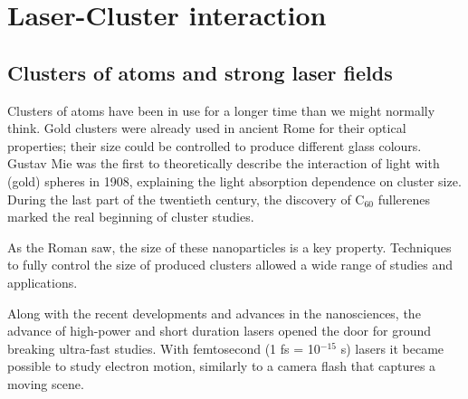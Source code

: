 
\section{Laser-Cluster interaction}

\subsection{Clusters of atoms and strong laser fields}

Clusters of atoms have been in use for a longer time than we might normally
think. Gold clusters were already used in ancient Rome for their optical
properties; their size could be controlled to produce different glass colours.
Gustav Mie was the first to theoretically describe the interaction of light
with (gold) spheres in 1908, explaining the light absorption dependence
on cluster size. During the last part of the twentieth century, the discovery of
C$_{60}$ fullerenes marked the real beginning of cluster studies.

As the Roman saw, the size of these nanoparticles is a key property. Techniques to fully
control the size of produced clusters allowed a wide range of studies and
applications.



Along with the recent developments and advances in the nanosciences,
the advance of high-power and short duration lasers opened the
door for ground breaking ultra-fast studies. With femtosecond
(1 fs = 10$^{-15}$ s) lasers it became possible to study electron motion,
similarly to a camera flash that captures a moving scene.

